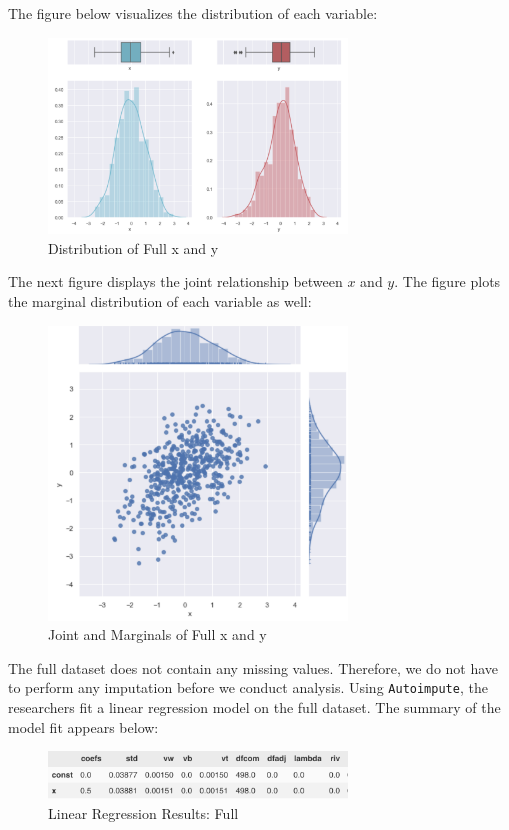 \documentclass[12pt,oneside]{chicagocapstone}
\begin{document}
The figure below visualizes the distribution of each variable:
\begin{figure}

{\centering \includegraphics[width=300px]{figure/full-side-by-side} 

}

\caption{Distribution of Full x and y}\label{fig:fullsidebyside}
\end{figure}
The next figure displays the joint relationship between \(x\) and \(y\).
The figure plots the marginal distribution of each variable as well:
\begin{figure}

{\centering \includegraphics[width=300px]{figure/full-joint} 

}

\caption{Joint and Marginals of Full x and y}\label{fig:full-joint}
\end{figure}
The full dataset does not contain any missing values. Therefore, we do
not have to perform any imputation before we conduct analysis. Using
\texttt{Autoimpute}, the researchers fit a linear regression model on
the full dataset. The summary of the model fit appears below:
\begin{figure}

{\centering \includegraphics[width=300px]{figure/full-regression} 

}

\caption{Linear Regression Results: Full}\label{fig:full-regression}
\end{figure}
\end{document}

